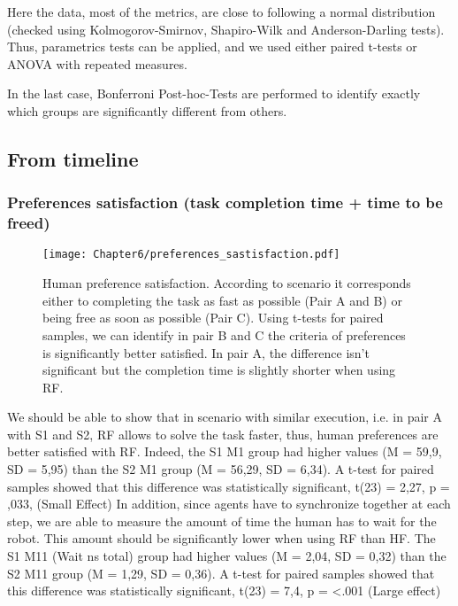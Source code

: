 Here the data, most of the metrics, are close to following a normal distribution (checked using Kolmogorov-Smirnov, Shapiro-Wilk and Anderson-Darling tests). Thus, parametrics tests can be applied, and we used either paired t-tests or ANOVA with repeated measures.

In the last case, Bonferroni Post-hoc-Tests are performed to identify exactly which groups are significantly different from others.



\subsection{From timeline}

\subsubsection*{Preferences satisfaction (task completion time + time to be freed)}

\begin{figure}
    \center
    \texttt{[image: Chapter6/preferences\_sastisfaction.pdf]}
    \caption{Human preference satisfaction. According to scenario it corresponds either to completing the task as fast as possible (Pair A and B) or being free as soon as possible (Pair C). Using t-tests for paired samples, we can identify in pair B and C the criteria of preferences is significantly better satisfied. In pair A, the difference isn't significant but the completion time is slightly shorter when using RF.}
    \label{fig:preferences_satisfaction}
\end{figure}

We should be able to show that in scenario with similar execution, i.e. in pair A with S1 and S2, RF allows to solve the task faster, thus, human preferences are better satisfied with RF. Indeed, the S1 M1 group had higher values (M = 59,9, SD = 5,95) than the S2 M1 group (M = 56,29, SD = 6,34). A t-test for paired samples showed that this difference was statistically significant, t(23) = 2,27, p = ,033, (Small Effect)
In addition, since agents have to synchronize together at each step, we are able to measure the amount of time the human has to wait for the robot. This amount should be significantly lower when using RF than HF.
The S1 M11 (Wait ns total) group had higher values (M = 2,04, SD = 0,32) than the S2 M11 group (M = 1,29, SD = 0,36). A t-test for paired samples showed that this difference was statistically significant, t(23) = 7,4, p = <.001 (Large effect)


